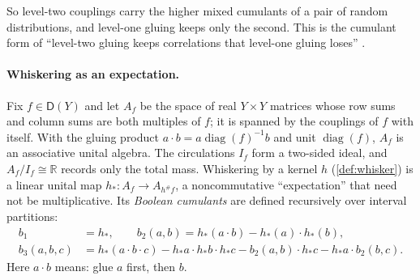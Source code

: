 \documentclass[11pt]{article}
\theoremstyle{definition}
\theoremstyle{remark}
\newcommand{\D}{\mathsf{D}}
\begin{document}
So level-two couplings carry the higher mixed cumulants of a pair of random distributions, and level-one
gluing keeps only the second. This is the cumulant form of ``level-two gluing keeps correlations that
level-one gluing loses'' \cite[Prop.~7.16]{Attribution}.

\paragraph{Whiskering as an expectation.} Fix $f\in\D(Y)$ and let $A_f$ be the space of real $Y\times Y$
matrices whose row sums and column sums are both multiples of $f$; it is spanned by the couplings of $f$ with
itself. With the gluing product $a\cdot b=a\operatorname{diag}(f)^{-1}b$ and unit $\operatorname{diag}(f)$, $A_f$ is an
associative unital algebra. The circulations $I_f$ form a two-sided ideal, and $A_f/I_f\cong\mathbb{R}$ records only
the total mass. Whiskering by a kernel $h$ (\cref{def:whisker}) is a linear unital map
$h_*\colon A_f\to A_{h^\#f}$, a noncommutative ``expectation'' that need not be multiplicative. Its
\emph{Boolean cumulants} \cite{SpeicherWoroudi1997} are defined recursively over interval partitions:
\begin{align*}
b_1&=h_*,\qquad b_2(a,b)=h_*(a\cdot b)-h_*(a)\cdot h_*(b),\\
b_3(a,b,c)&=h_*(a\cdot b\cdot c)-h_*a\cdot h_*b\cdot h_*c-b_2(a,b)\cdot h_*c-h_*a\cdot b_2(b,c).
\end{align*}
Here $a\cdot b$ means: glue $a$ first, then $b$.
\end{document}
